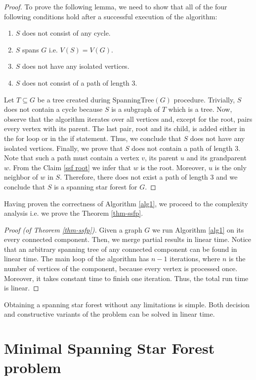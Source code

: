 \documentclass[en]{pracamgr}
\theoremstyle{definition}
\newcommand{\ssf}{spanning star forest}
\begin{document}
\begin{proof}
	To prove the following lemma, we need to show that all of the four following conditions hold after a successful execution of the algorithm:
	\begin{enumerate}
		\item $S$ does not consist of any cycle.
		\item $S$ spans $G$ i.e. $V(S) = V(G)$.
		\item $S$ does not have any isolated vertices.
		\item $S$ does not consist of a path of length $3$.
	\end{enumerate}
	Let $T \subseteq G$ be a tree created during \textrm{SpanningTree}$(G)$ procedure. Trivially, $S$ does not contain a cycle because $S$ is a subgraph of $T$ which is a tree. Now, observe that the algorithm iterates over all vertices and, except for the root, pairs every vertex with its parent. The last pair, root and its child, is added either in the for loop or in the if statement. Thus, we conclude that $S$ does not have any isolated vertices. Finally, we prove that $S$ does not contain a path of length $3$. Note that such a path must contain a vertex $v$, its parent $u$ and its grandparent $w$. From the Claim \ref{ssf root} we infer that $w$ is the root. Moreover, $u$ is the only neighbor of $w$ in $S$. Therefore, there does not exist a path of length $3$ and we conclude that $S$ is a spanning star forest for $G$. 
\end{proof}

Having proven the correctness of Algorithm \ref{alg1}, we proceed to the complexity analysis i.e. we prove the Theorem \ref{thm-ssfp}.

\begin{proof}[Proof (of Theorem \ref{thm-ssfp})]
	Given a graph $G$ we run Algorithm \ref{alg1} on its every connected component. Then, we  merge partial results in linear time. Notice that an arbitrary spanning tree of any connected component can be found in linear time. The main loop of the algorithm has $n-1$ iterations, where $n$ is the number of vertices of the component, because every vertex is processed once. Moreover, it takes constant time to finish one iteration. Thus, the total run time is linear.
\end{proof}

Obtaining a \ssf{} without any limitations is simple. Both decision and constructive variants of the problem can be solved in linear time.

\chapter{Minimal Spanning Star Forest problem}
\end{document}
